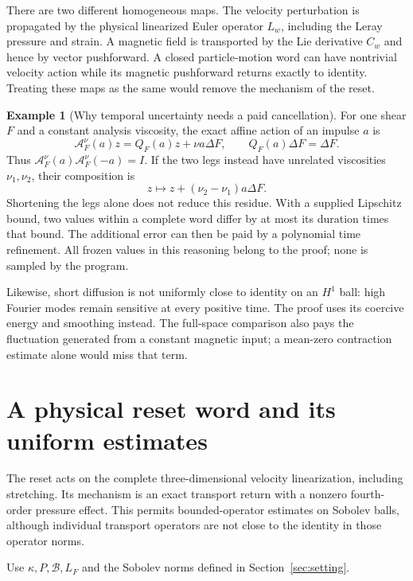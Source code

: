 \documentclass[11pt,a4paper]{amsart}
\theoremstyle{definition}
\newtheorem{example}[theorem]{Example}
\theoremstyle{remark}
\numberwithin{equation}{section}
\newcommand{\Bcal}{\mathcal B}
\begin{document}
There are two different homogeneous maps. The velocity perturbation is propagated by the physical linearized Euler operator $L_w$, including the Leray pressure and strain. A magnetic field is transported by the Lie derivative $C_w$ and hence by vector pushforward. A closed particle-motion word can have nontrivial velocity action while its magnetic pushforward returns exactly to identity. Treating these maps as the same would remove the mechanism of the reset.

\begin{example}[Why temporal uncertainty needs a paid cancellation]\label{ex:affine}
For one shear $F$ and a constant analysis viscosity, the exact affine action of an impulse $a$ is
\[
 \mathcal A_F^\nu(a)z=Q_F(a)z+\nu a\Delta F,
 \qquad Q_F(a)\Delta F=\Delta F.
\]
Thus $\mathcal A_F^\nu(a)\mathcal A_F^\nu(-a)=I$. If the two legs instead have unrelated viscosities $\nu_1,\nu_2$, their composition is
\[
 z\longmapsto z+(\nu_2-\nu_1)a\Delta F.
\]
Shortening the legs alone does not reduce this residue. With a supplied Lipschitz bound, two values within a complete word differ by at most its duration times that bound. The additional error can then be paid by a polynomial time refinement. All frozen values in this reasoning belong to the proof; none is sampled by the program.
\end{example}

Likewise, short diffusion is not uniformly close to identity on an $H^1$ ball: high Fourier modes remain sensitive at every positive time. The proof uses its coercive energy and smoothing instead. The full-space comparison also pays the fluctuation generated from a constant magnetic input; a mean-zero contraction estimate alone would miss that term.



\section{A physical reset word and its uniform estimates}
\label{fnd:section}\label{sec:foundations}

The reset acts on the complete three-dimensional velocity linearization,
including stretching. Its mechanism is an exact transport return with a nonzero
fourth-order pressure effect. This permits bounded-operator estimates on Sobolev
balls, although individual transport operators are not close to the identity in
those operator norms.

Use $\kappa,P,\Bcal,L_F$ and the Sobolev norms defined in Section~\ref{sec:setting}. 
\end{document}
